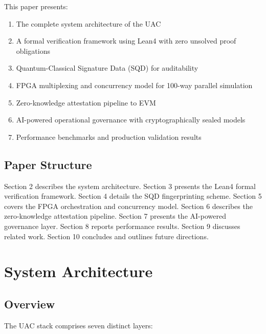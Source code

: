 \documentclass[11pt,a4paper]{article}
\theoremstyle{plain}
\begin{document}
This paper presents:
\begin{enumerate}
    \item The complete system architecture of the UAC
    \item A formal verification framework using Lean4 with zero unsolved proof obligations
    \item Quantum-Classical Signature Data (SQD) for auditability
    \item FPGA multiplexing and concurrency model for 100-way parallel simulation
    \item Zero-knowledge attestation pipeline to EVM
    \item AI-powered operational governance with cryptographically sealed models
    \item Performance benchmarks and production validation results
\end{enumerate}

\subsection{Paper Structure}

Section 2 describes the system architecture. Section 3 presents the Lean4 formal verification framework. Section 4 details the SQD fingerprinting scheme. Section 5 covers the FPGA orchestration and concurrency model. Section 6 describes the zero-knowledge attestation pipeline. Section 7 presents the AI-powered governance layer. Section 8 reports performance results. Section 9 discusses related work. Section 10 concludes and outlines future directions.

\section{System Architecture}

\subsection{Overview}

The UAC stack comprises seven distinct layers:
\end{document}
